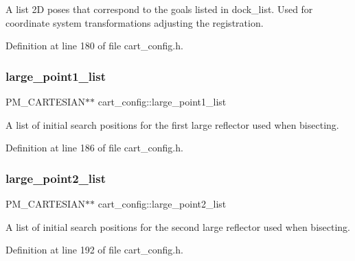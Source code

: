 A list 2D poses that correspond to the goals listed in dock\+\_\+list. Used for coordinate system transformations adjusting the registration. 

Definition at line 180 of file cart\+\_\+config.\+h.

\mbox{\label{classcart__config_ae86eebedcace9bd7afabc6f264051ceb}} 
\subsubsection{\texorpdfstring{large\+\_\+point1\+\_\+list}{large\_point1\_list}}
{\footnotesize\ttfamily P\+M\+\_\+\+C\+A\+R\+T\+E\+S\+I\+AN$\ast$$\ast$ cart\+\_\+config\+::large\+\_\+point1\+\_\+list\hspace{0.3cm}{\ttfamily [private]}}

A list of initial search positions for the first large reflector used when bisecting. 

Definition at line 186 of file cart\+\_\+config.\+h.

\mbox{\label{classcart__config_a8f71e861e41c9f8fee2c05f2bad2d31e}} 
\subsubsection{\texorpdfstring{large\+\_\+point2\+\_\+list}{large\_point2\_list}}
{\footnotesize\ttfamily P\+M\+\_\+\+C\+A\+R\+T\+E\+S\+I\+AN$\ast$$\ast$ cart\+\_\+config\+::large\+\_\+point2\+\_\+list\hspace{0.3cm}{\ttfamily [private]}}

A list of initial search positions for the second large reflector used when bisecting. 

Definition at line 192 of file cart\+\_\+config.\+h.

\mbox{\label{classcart__config_a79325b64754bf4e6135d77234c85e2d8}} 
